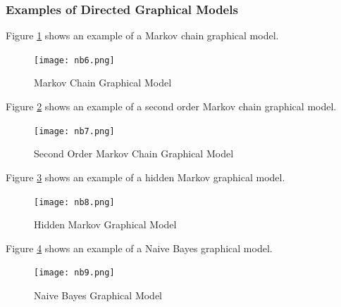 \documentclass{article}
\begin{document}
\subsubsection{Examples of Directed Graphical Models}
\begin{example}
Figure \ref{fig:nb6} shows an example of a Markov chain graphical model.
\begin{figure}[!ht]
    \centering
    \texttt{[image: nb6.png]}
    \caption{Markov Chain Graphical Model}
    \label{fig:nb6}
\end{figure}
\end{example}

\begin{example}
Figure \ref{fig:nb7} shows an example of a second order Markov chain graphical model.
\begin{figure}[!ht]
    \centering
    \texttt{[image: nb7.png]}
    \caption{Second Order Markov Chain Graphical Model}
    \label{fig:nb7}
\end{figure}
\end{example}

\begin{example}
Figure \ref{fig:nb8} shows an example of a hidden Markov graphical model.
\begin{figure}[!ht]
    \centering
    \texttt{[image: nb8.png]}
    \caption{Hidden Markov Graphical Model}
    \label{fig:nb8}
\end{figure}
\end{example}

\begin{example}
Figure \ref{fig:nb9} shows an example of a Naive Bayes graphical model.
\begin{figure}[!ht]
    \centering
    \texttt{[image: nb9.png]}
    \caption{Naive Bayes Graphical Model}
    \label{fig:nb9}
\end{figure}
\end{example}
\FloatBarrier
\end{document}
